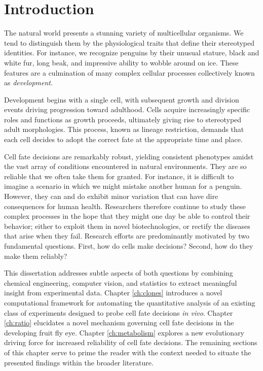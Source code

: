 \chapter{Introduction}

The natural world presents a stunning variety of multicellular organisms. We tend to distinguish them by the physiological traits that define their stereotyped identities. For instance, we recognize penguins by their unusual stature, black and white fur, long beak, and impressive ability to wobble around on ice. These features are a culmination of many complex cellular processes collectively known as \emph{development}.

Development begins with a single cell, with subsequent growth and division events driving progression toward adulthood. Cells acquire increasingly specific roles and functions as growth proceeds, ultimately giving rise to stereotyped adult morphologies. This process, known as lineage restriction, demands that each cell decides to adopt the correct fate at the appropriate time and place.

Cell fate decisions are remarkably robust, yielding consistent phenotypes amidst the vast array of conditions encountered in natural environments. They are so reliable that we often take them for granted. For instance, it is difficult to imagine a scenario in which we might mistake another human for a penguin. However, they can and do exhibit minor variation that can have dire consequences for human health. Researchers therefore continue to study these complex processes in the hope that they might one day be able to control their behavior; either to exploit them in novel biotechnologies, or rectify the diseases that arise when they fail. Research efforts are predominantly motivated by two fundamental questions. First, how do cells make decisions? Second, how do they make them reliably? 

This dissertation addresses subtle aspects of both questions by combining chemical engineering, computer vision, and statistics to extract meaningful insight from experimental data. Chapter \ref{ch:clones} introduces a novel computational framework for automating the quantitative analysis of an existing class of experiments designed to probe cell fate decisions \textit{in vivo}. Chapter \ref{ch:ratio} elucidates a novel mechanism governing cell fate decisions in the developing fruit fly eye. Chapter \ref{ch:metabolism} explores a new evolutionary driving force for increased reliability of cell fate decisions. The remaining sections of this chapter serve to prime the reader with the context needed to situate the presented findings within the broader literature. 

